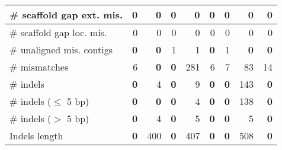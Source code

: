 \documentclass[12pt,a4paper]{article}
\begin{document}
\begin{table}[ht]
\begin{center}
\begin{tabular}{|l*{8}{|r}|}
\# scaffold gap ext. mis. & 0 & 0 & 0 & 0 & 0 & 0 & 0 & 0 \\ \hline
\# scaffold gap loc. mis. & 0 & 0 & 0 & 0 & 0 & 0 & 0 & 0 \\ \hline
\# unaligned mis. contigs & {\bf 0} & {\bf 0} & 1 & 1 & {\bf 0} & 1 & {\bf 0} & {\bf 0} \\ \hline
\# mismatches & 6 & {\bf 0} & {\bf 0} & 281 & 6 & 7 & 83 & 14 \\ \hline
\# indels & {\bf 0} & 4 & {\bf 0} & 9 & {\bf 0} & {\bf 0} & 143 & {\bf 0} \\ \hline
\hspace{5mm}\# indels ($\leq$ 5 bp) & {\bf 0} & {\bf 0} & {\bf 0} & 4 & {\bf 0} & {\bf 0} & 138 & {\bf 0} \\ \hline
\hspace{5mm}\# indels ($>$ 5 bp) & {\bf 0} & 4 & {\bf 0} & 5 & {\bf 0} & {\bf 0} & 5 & {\bf 0} \\ \hline
Indels length & {\bf 0} & 400 & {\bf 0} & 407 & {\bf 0} & {\bf 0} & 508 & {\bf 0} \\ \hline
\end{tabular}
\end{center}
\end{table}
\end{document}
